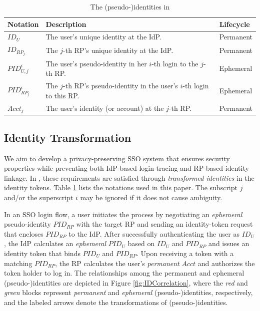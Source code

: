 \begin{table}
\footnotesize
    \caption{The (pseudo-)identities in \usso}
    \centering
    \begin{tabular}{|p{1.0cm}|p{5.1cm}|p{1.13cm}|} \hline
    {\textbf{Notation}} & {\textbf{Description}} & {\textbf{Lifecycle}} \\ \hline
    {$ID_U$} & {The user's unique identity at the IdP.} & {Permanent} \\ \hline
    {$ID_{RP_j}$} & {The $j$-th RP's unique identity at the IdP.} & {Permanent} \\ \hline
    {$PID_{U,j}^i$} & {The user's pseudo-identity in her $i$-th login to the $j$-th RP.} & {Ephemeral} \\ \hline
    {$PID_{RP_j}^i$} & {The $j$-th RP's pseudo-identity in the user's $i$-th login to this RP.} & {Ephemeral} \\ \hline
    {$Acct_j$} & {The user's identity (or account) at the $j$-th RP.} & {Permanent} \\ \hline
    \end{tabular}
    \label{tbl:notations-dilemma}
\end{table}

\subsection{Identity Transformation}
\label{subsec:solutions}

We aim to develop a privacy-preserving SSO system that ensures security properties while preventing both IdP-based login tracing and RP-based identity linkage.
In \usso, these requirements are satisfied through \emph{transformed identities} in the identity tokens. Table \ref{tbl:notations-dilemma} lists the notations used in this paper.
The subscript $j$ and/or the superscript $i$ may be ignored if it does not cause ambiguity.

\newc
In an SSO login flow, a user initiates the process by negotiating an \emph{ephemeral} pseudo-identity $PID_{RP}$  with the target RP and sending an identity-token request that encloses $PID_{RP}$ to the IdP.
After successfully authenticating the user as $ID_U$, the IdP calculates an \emph{ephemeral} $PID_U$ based on $ID_U$ and $PID_{RP}$ and issues an identity token that binds $PID_U$ and $PID_{RP}$. Upon receiving a token with a matching $PID_{RP}$, the RP calculates the user's \emph{permanent} $Acct$ and authorizes the token holder to log in.
The relationships among the permanent and ephemeral (pseudo-)identities are depicted in Figure \ref{fig:IDCorrelation}, where the \emph{red} and \emph{green} blocks represent \emph{permanent} and \emph{ephemeral} (pseudo-)identities, respectively, and the labeled arrows denote the transformations of (pseudo-)identities.

